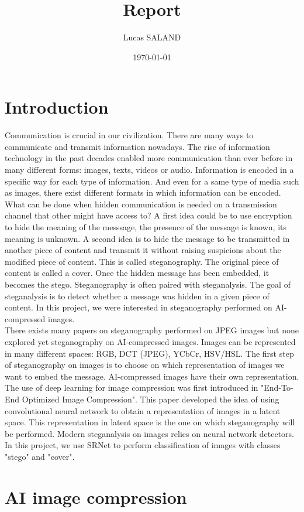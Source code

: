 \documentclass[12pt]{article}
\title{Report}
\author{Lucas SALAND}
\date{\today}
\begin{document}

\tableofcontents
\listoffigures
\listoftables
\clearpage
\section{Introduction}
Communication is crucial in our civilization. There are many ways to communicate and transmit information nowadays. The rise of information technology in the past decades enabled more communication than ever before in many different forms: images, texts, videos or audio. Information is encoded in a specific way for each type of information. And even for a same type of media such as images, there exist different formats in which information can be encoded. What can be done when hidden communication is needed on a transmission channel that other might have access to? A first idea could be to use encryption to hide the meaning of the messsage, the presence of the message is known, its meaning is unknown.  A second idea is to hide the message to be transmitted in another piece of content and transmit it without raising suspicions about the modified piece of content. This is called steganography. The original piece of content is called a cover. Once the hidden message has been embedded, it becomes the stego. Steganography is often paired with steganalysis. The goal of steganalysis is to detect whether a message was hidden in a given piece of content. In this project, we were interested in steganography performed on AI-compressed images.\\
There exists many papers on steganography performed on JPEG images but none explored yet steganography on AI-compressed images. Images can be represented in many different spaces: RGB, DCT (JPEG), YCbCr, HSV/HSL. The first step of steganography on images is to choose on which representation of images we want to embed the message. AI-compressed images have their own representation.\\
The use of deep learning for image compression was first introduced in "End-To-End Optimized Image Compression". This paper developed the idea of using convolutional neural network to obtain a representation of images in a latent space. This representation in latent space is the one on which steganography will be performed. Modern steganalysis on images relies on neural network detectors. In this project, we use SRNet to perform classification of images with classes "stego" and "cover".

\section{AI image compression}
\end{document}
